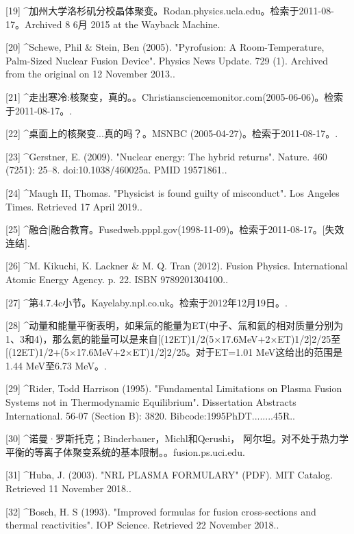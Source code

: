 [19]
^加州大学洛杉矶分校晶体聚变。Rodan.physics.ucla.edu。检索于2011-08-17。Archived 8 6月 2015 at the Wayback Machine.

[20]
^Schewe, Phil & Stein, Ben (2005). "Pyrofusion: A Room-Temperature, Palm-Sized Nuclear Fusion Device". Physics News Update. 729 (1). Archived from the original on 12 November 2013..

[21]
^走出寒冷:核聚变，真的。。Christiansciencemonitor.com(2005-06-06)。检索于2011-08-17。.

[22]
^桌面上的核聚变...真的吗？。MSNBC (2005-04-27)。检索于2011-08-17。.

[23]
^Gerstner, E. (2009). "Nuclear energy: The hybrid returns". Nature. 460 (7251): 25–8. doi:10.1038/460025a. PMID 19571861..

[24]
^Maugh II, Thomas. "Physicist is found guilty of misconduct". Los Angeles Times. Retrieved 17 April 2019..

[25]
^融合|融合教育。Fusedweb.pppl.gov(1998-11-09)。检索于2011-08-17。[失效连结].

[26]
^M. Kikuchi, K. Lackner & M. Q. Tran (2012). Fusion Physics. International Atomic Energy Agency. p. 22. ISBN 9789201304100..

[27]
^第4.7.4c小节。Kayelaby.npl.co.uk。检索于2012年12月19日。.

[28]
^动量和能量平衡表明，如果氚的能量为ET(中子、氚和氦的相对质量分别为1、3和4)，那么氦的能量可以是来自[(12ET)1/2(5×17.6MeV+2×ET)1/2]2/25至[(12ET)1/2+(5×17.6MeV+2×ET)1/2]2/25。对于ET=1.01 MeV这给出的范围是1.44 MeV至6.73 MeV。.

[29]
^Rider, Todd Harrison (1995). "Fundamental Limitations on Plasma Fusion Systems not in Thermodynamic Equilibrium". Dissertation Abstracts International. 56-07 (Section B): 3820. Bibcode:1995PhDT........45R..

[30]
^诺曼·罗斯托克；Binderbauer，Michl和Qerushi， 阿尔坦。对不处于热力学平衡的等离子体聚变系统的基本限制。。fusion.ps.uci.edu.

[31]
^Huba, J. (2003). "NRL PLASMA FORMULARY" (PDF). MIT Catalog. Retrieved 11 November 2018..

[32]
^Bosch, H. S (1993). "Improved formulas for fusion cross-sections and thermal reactivities". IOP Science. Retrieved 22 November 2018..